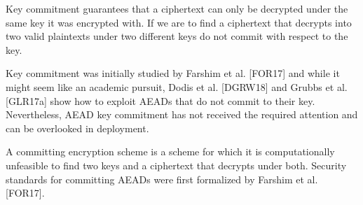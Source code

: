 Key commitment guarantees that a ciphertext can only be
decrypted under the same key it was encrypted with.
If we are to find a ciphertext that decrypts into two valid plaintexts under two different keys do not commit with respect to the key.

Key commitment was initially studied by Farshim et al. [FOR17] and while it might seem like an academic pursuit, Dodis et
al. [DGRW18] and Grubbs et al. [GLR17a] show how to exploit AEADs that do not commit to their key.
Nevertheless, AEAD key commitment has not received the required attention and can be overlooked in deployment.

A committing encryption scheme is a scheme for which it is computationally unfeasible to find two keys and a ciphertext that decrypts under both.
Security standards for committing AEADs were first formalized by Farshim et al. [FOR17].